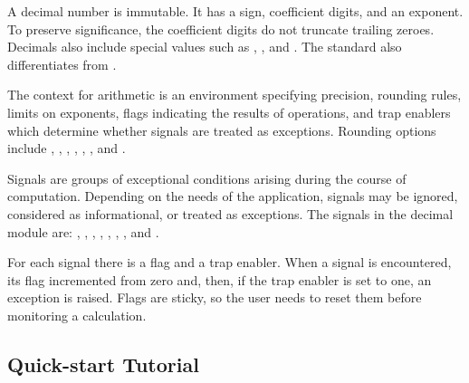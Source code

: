A decimal number is immutable.  It has a sign, coefficient digits, and an
exponent.  To preserve significance, the coefficient digits do not truncate
trailing zeroes.  Decimals also include special values such as
, , and .  The standard
also differentiates  from .
                                                   
The context for arithmetic is an environment specifying precision, rounding
rules, limits on exponents, flags indicating the results of operations,
and trap enablers which determine whether signals are treated as
exceptions.  Rounding options include ,
, , ,
, , and .

Signals are groups of exceptional conditions arising during the course of
computation.  Depending on the needs of the application, signals may be
ignored, considered as informational, or treated as exceptions. The signals in
the decimal module are: , ,
, , ,
, , and .

For each signal there is a flag and a trap enabler.  When a signal is
encountered, its flag incremented from zero and, then, if the trap enabler
is set to one, an exception is raised.  Flags are sticky, so the user
needs to reset them before monitoring a calculation.


\begin{seealso}

\end{seealso}



\subsection{Quick-start Tutorial \label{decimal-tutorial}}

